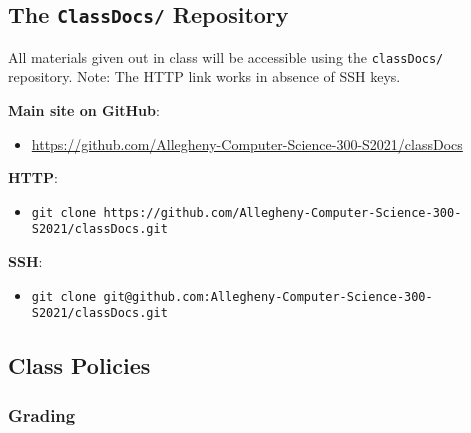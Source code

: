 \documentclass[11pt]{article} %
\begin{document}
\subsection*{\textbf{The {\tt ClassDocs/} Repository}}
All materials given out in class will be accessible using the {\tt classDocs/} repository. Note: The HTTP link works in absence of SSH keys.

\textbf{Main site on GitHub}: 
	\begin{itemize}
		\item \footnotesize \url{https://github.com/Allegheny-Computer-Science-300-S2021/classDocs}
	\end{itemize}

\textbf{HTTP}: 
	\begin{itemize}
		\item {\tt \footnotesize git clone https://github.com/Allegheny-Computer-Science-300-S2021/classDocs.git}
	\end{itemize}

\textbf{SSH}: 
	\begin{itemize}
		\item {\tt \footnotesize git clone git@github.com:Allegheny-Computer-Science-300-S2021/classDocs.git}
	\end{itemize}







\subsection*{\textbf{Class Policies}}

\subsubsection*{\textbf{Grading}}
\end{document}
